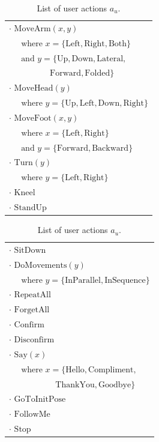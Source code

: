 \renewcommand{\arraystretch}{1.3}

\begin{table}[h]
\begin{footnotesize}
\begin{tabular}{p{60mm}} 
$\cdot$ $\mathrm{MoveArm}(x,y) $ \\ $ \ \ \ \ \ \text{ where } x=\{\mathrm{Left,Right,Both}\} $ \\ $ \ \ \ \ \  \text{ and } y = \{\mathrm{Up,Down,Lateral,}$ \\ $\ \ \ \ \ \ \ \ \ \  \ \ \ \ \ \ \ \ \ \ \ \ \mathrm{Forward,Folded}\}$ \\
$\cdot$ $\mathrm{MoveHead}(y) $ \\ $\ \ \ \ \  \text{ where } y = \{\mathrm{Up,Left,Down,Right}\}$ \\
$\cdot$ $\mathrm{MoveFoot}(x,y) $ \\ $\ \ \ \ \  \text{ where } x = \{\mathrm{Left,Right}\} $ \\ $\ \ \ \ \ \text{ and } y = \{\mathrm{Forward,Backward}\}$ \\
$\cdot$ $\mathrm{Turn}(y) $ \\ $\ \ \ \ \ \text{ where } y = \{\mathrm{Left,Right}\}$ \\ 
$\cdot$ $\mathrm{Kneel}$ \\
$\cdot$ $\mathrm{StandUp}$ 
\end{tabular}
\hspace{2cm}
\begin{tabular}{p{60mm}} 
$\cdot$ $\mathrm{SitDown}$ \\
$\cdot$ $\mathrm{DoMovements}(y) $ \\ $ \ \ \ \ \  \text{ where } y = \{\mathrm{InParallel,InSequence}\}$\\
$\cdot$ $\mathrm{RepeatAll}$ \\
$\cdot$ $\mathrm{ForgetAll}$ \\
$\cdot$ $\mathrm{Confirm}$ \\
$\cdot$ $\mathrm{Disconfirm}$ \\
$\cdot$ $\mathrm{Say}(x)$ \\  $ \ \ \ \ \  \text{ where } x = \{\mathrm{Hello, Compliment,}$ \\ $\ \ \ \ \ \ \ \ \ \ \ \ \ \ \ \ \ \ \ \ \ \ \ \ \  \mathrm{ThankYou, Goodbye}\}$\\
$\cdot$ $\mathrm{GoToInitPose}$ \\ 
$\cdot$ $\mathrm{FollowMe}$ \\
$\cdot$ $\mathrm{Stop}$ 
\end{tabular}
\end{footnotesize}
 \caption{List of user actions $a_u$.} 
\label{table:userdas}
\end{table}

